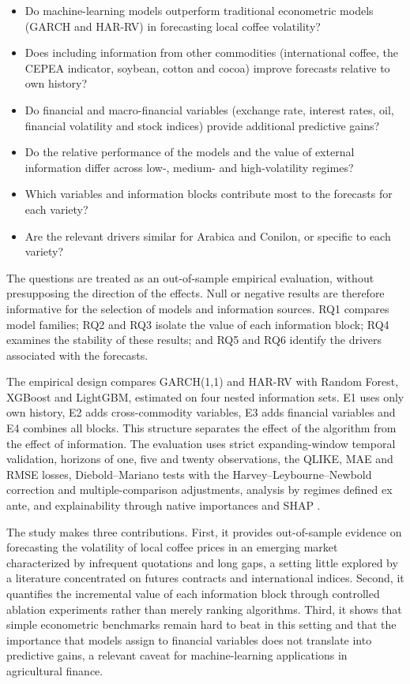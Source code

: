 \documentclass[a4paper,fleqn]{cas-sc}
\begin{document}
\begin{itemize}
\item[\textbf{RQ1.}] Do machine-learning models outperform traditional econometric models (GARCH and HAR-RV) in forecasting local coffee volatility?
\item[\textbf{RQ2.}] Does including information from other commodities (international coffee, the CEPEA indicator, soybean, cotton and cocoa) improve forecasts relative to own history?
\item[\textbf{RQ3.}] Do financial and macro-financial variables (exchange rate, interest rates, oil, financial volatility and stock indices) provide additional predictive gains?
\item[\textbf{RQ4.}] Do the relative performance of the models and the value of external information differ across low-, medium- and high-volatility regimes?
\item[\textbf{RQ5.}] Which variables and information blocks contribute most to the forecasts for each variety?
\item[\textbf{RQ6.}] Are the relevant drivers similar for Arabica and Conilon, or specific to each variety?
\end{itemize}

The questions are treated as an out-of-sample empirical evaluation, without presupposing the direction of the effects. Null or negative results are therefore informative for the selection of models and information sources. RQ1 compares model families; RQ2 and RQ3 isolate the value of each information block; RQ4 examines the stability of these results; and RQ5 and RQ6 identify the drivers associated with the forecasts.

The empirical design compares GARCH(1,1) and HAR-RV with Random Forest, XGBoost and LightGBM, estimated on four nested information sets. E1 uses only own history, E2 adds cross-commodity variables, E3 adds financial variables and E4 combines all blocks. This structure separates the effect of the algorithm from the effect of information. The evaluation uses strict expanding-window temporal validation, horizons of one, five and twenty observations, the QLIKE, MAE and RMSE losses, Diebold--Mariano tests with the Harvey--Leybourne--Newbold correction and multiple-comparison adjustments, analysis by regimes defined ex ante, and explainability through native importances and SHAP \citep{Wang2024SystemicRiskML,Diachkov2026FinancialStressML}.

The study makes three contributions. First, it provides out-of-sample evidence on forecasting the volatility of local coffee prices in an emerging market characterized by infrequent quotations and long gaps, a setting little explored by a literature concentrated on futures contracts and international indices. Second, it quantifies the incremental value of each information block through controlled ablation experiments rather than merely ranking algorithms. Third, it shows that simple econometric benchmarks remain hard to beat in this setting and that the importance that models assign to financial variables does not translate into predictive gains, a relevant caveat for machine-learning applications in agricultural finance.
\end{document}
